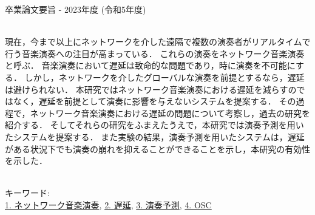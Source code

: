 卒業論文要旨 - 2023年度 (令和5年度)
\begin{center}
\begin{large}
\end{large}
\end{center}

~ \\

現在，今まで以上にネットワークを介した遠隔で複数の演奏者がリアルタイムで行う音楽演奏への注目が高まっている．
これらの演奏をネットワーク音楽演奏と呼ぶ．
音楽演奏において遅延は致命的な問題であり，時に演奏を不可能にする．
しかし，ネットワークを介したグローバルな演奏を前提とするなら，遅延は避けられない．
本研究ではネットワーク音楽演奏における遅延を減らすのではなく，遅延を前提として演奏に影響を与えないシステムを提案する．
その過程で，ネットワーク音楽演奏における遅延の問題について考察し，過去の研究を紹介する．
そしてそれらの研究をふまえたうえで，本研究では演奏予測を用いたシステムを提案する．
また実験の結果，演奏予測を用いたシステムは，遅延がある状況下でも演奏の崩れを抑えることができることを示し，本研究の有効性を示した．

~ \\
キーワード:\\
\underline{1. ネットワーク音楽演奏},
\underline{2. 遅延},
\underline{3. 演奏予測},
\underline{4. OSC}
\begin{flushright}
\dept \\
\author
\end{flushright}
